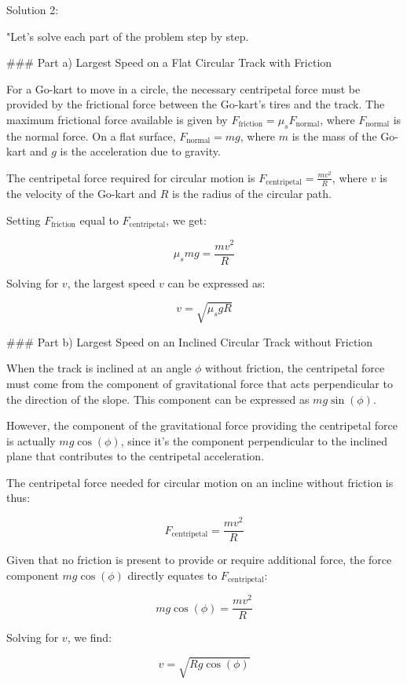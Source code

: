 Solution 2:

"Let's solve each part of the problem step by step.

### Part a) Largest Speed on a Flat Circular Track with Friction

For a Go-kart to move in a circle, the necessary centripetal force must be provided by the frictional force between the Go-kart's tires and the track. The maximum frictional force available is given by \( F_{\text{friction}} = \mu_{s} F_{\text{normal}} \), where \( F_{\text{normal}} \) is the normal force. On a flat surface, \( F_{\text{normal}} = mg \), where \( m \) is the mass of the Go-kart and \( g \) is the acceleration due to gravity.

The centripetal force required for circular motion is \( F_{\text{centripetal}} = \frac{mv^2}{R} \), where \( v \) is the velocity of the Go-kart and \( R \) is the radius of the circular path.

Setting \( F_{\text{friction}} \) equal to \( F_{\text{centripetal}} \), we get:

\[
\mu_{s} mg = \frac{mv^2}{R}
\]

Solving for \( v \), the largest speed \( v \) can be expressed as:

\[
v = \sqrt{\mu_{s} g R}
\]

### Part b) Largest Speed on an Inclined Circular Track without Friction

When the track is inclined at an angle \( \phi \) without friction, the centripetal force must come from the component of gravitational force that acts perpendicular to the direction of the slope. This component can be expressed as \( mg\sin(\phi) \).

However, the component of the gravitational force providing the centripetal force is actually \( mg\cos(\phi) \), since it's the component perpendicular to the inclined plane that contributes to the centripetal acceleration.

The centripetal force needed for circular motion on an incline without friction is thus:

\[
F_{\text{centripetal}} = \frac{mv^2}{R}
\]

Given that no friction is present to provide or require additional force, the force component \( mg\cos(\phi) \) directly equates to \( F_{\text{centripetal}} \):

\[
mg\cos(\phi) = \frac{mv^2}{R}
\]

Solving for \( v \), we find:

\[
v = \sqrt{Rg\cos(\phi)}
\]


